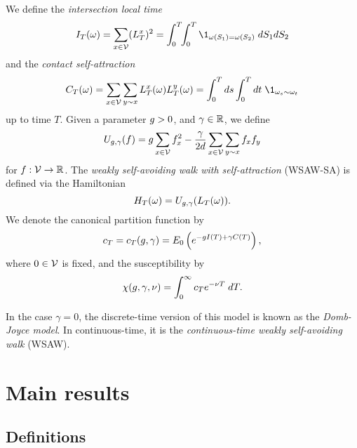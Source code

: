 We define the \emph{intersection local time}
\begin{equation}
\label{e:ITdef}
I_T(\omega) = \sum_{x\in\vertices} (\lt^x_T)^2
  =
\int_0^T \!\! \int_0^T \1_{\omega(S_1)=\omega(S_2)} \; dS_1 dS_2
\end{equation}
and the \emph{contact self-attraction}
\begin{equation}
\label{e:CTdef}
C_T(\omega) =
  \sum_{x \in \vertices} \sum_{y \sim x} \lt_T^x(\omega) \lt_T^y(\omega)
  = \int_0^T ds \int_0^T dt \; \1_{\omega_{s} \sim \omega_{t}}
\end{equation}
up to time $T$.
Given a parameter $g > 0$,
and $\gamma \in {\mathbb R}$, we define
\begin{equation}
\label{e:Udef-neg}
U_{g,\gamma}(f)
=
g \sum_{x\in\mathcal{V}} f_x^2
- \frac{\gamma}{2d}
\sum_{x\in\mathcal{V}} \sum_{y \sim x} f_x f_y
\end{equation}
for $f : \mathcal{V} \rightarrow {\mathbb R}$.
The \emph{weakly self-avoiding walk with self-attraction} (WSAW-SA) is defined via the Hamiltonian
\begin{equation}
H_T(\omega) = U_{g,\gamma}(L_T(\omega)).
\end{equation}
We denote the canonical partition function by
\begin{equation}
c_T = c_T(g, \gamma) = E_0 \left( e^{-g I(T) + \gamma C(T)} \right),
\end{equation}
where $0 \in \mathcal{V}$ is fixed, and the susceptibility by
\begin{equation}
\chi(g, \gamma, \nu) = \int_0^\infty c_T e^{-\nu T} \; dT.
\end{equation}

In the case $\gamma = 0$, the discrete-time version of this model is known as
the \emph{Domb-Joyce model}. In continuous-time, it is the
\emph{continuous-time weakly self-avoiding walk} (WSAW).


\section{Main results}


\subsection{Definitions}


